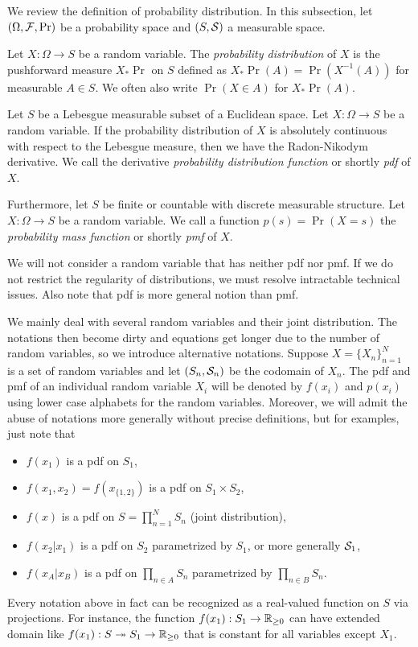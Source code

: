 \documentclass{../exp}
\begin{document}
We review the definition of probability distribution.
In this subsection, let $(\Omega,\mathcal{F},\Pr)$ be a probability space and $(S,\mathcal{S})$ a measurable space.
\begin{defn}
Let $X:\Omega\to S$ be a random variable.
The \emph{probability distribution} of $X$ is the pushforward measure $X_*\Pr$ on $S$ defined as $X_*\Pr(A)=\Pr(X^{-1}(A))$ for measurable $A\in S$.
We often also write $\Pr(X\in A)$ for $X_*\Pr(A)$.
\end{defn}
\begin{defn}
Let $S$ be a Lebesgue measurable subset of a Euclidean space.
Let $X:\Omega\to S$ be a random variable.
If the probability distribution of $X$ is absolutely continuous with respect to the Lebesgue measure, then we have the Radon-Nikodym derivative.
We call the derivative \emph{probability distribution function} or shortly \emph{pdf} of $X$.
\end{defn}
\begin{defn}
Furthermore, let $S$ be finite or countable with discrete measurable structure.
Let $X:\Omega\to S$ be a random variable.
We call a function $p(s)=\Pr(X=s)$ the \emph{probability mass function} or shortly \emph{pmf} of $X$.
\end{defn}

We will not consider a random variable that has neither pdf nor pmf.
If we do not restrict the regularity of distributions, we must resolve intractable technical issues.
Also note that pdf is more general notion than pmf.

We mainly deal with several random variables and their joint distribution.
The notations then become dirty and equations get longer due to the number of random variables, so we introduce alternative notations.
Suppose $X=\{X_n\}_{n=1}^N$ is a set of random variables and let $(S_n,\mathcal{S}_n)$ be the codomain of $X_n$.
The pdf and pmf of an individual random variable $X_i$ will be denoted by $f(x_i)$ and $p(x_i)$ using lower case alphabets for the random variables.
Moreover, we will admit the abuse of notations more generally without precise definitions, but for examples, just note that
\begin{itemize}
\item $f(x_1)$ is a pdf on $S_1$,
\item $f(x_1,x_2)=f(x_{\{1,2\}})$ is a pdf on $S_1\times S_2$,
\item $f(x)$ is a pdf on $S=\prod_{n=1}^NS_n$ (joint distribution),
\item $f(x_2|x_1)$ is a pdf on $S_2$ parametrized by $S_1$, or more generally $\mathcal{S}_1$,
\item $f(x_A|x_B)$ is a pdf on $\prod_{n\in A}S_n$ parametrized by $\prod_{n\in B}S_n$.
\end{itemize}
Every notation above in fact can be recognized as a real-valued function on $S$ via projections.
For instance, the function $f(x_1):S_1\to\R_{\ge0}$ can have extended domain like $f(x_1):S\ep S_1\to\R_{\ge0}$ that is constant for all variables except $X_1$.
\end{document}
